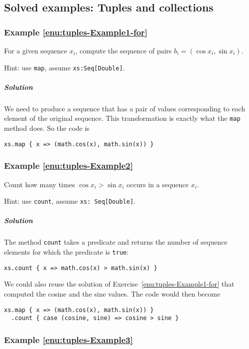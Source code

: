 \subsection{Solved examples: Tuples and collections}

\subsubsection{Example \label{enu:tuples-Example1-for}\ref{enu:tuples-Example1-for}}

For a given sequence $x_{i}$, compute the sequence of pairs $b_{i}=\left(\cos x_{i},\sin x_{i}\right)$.

Hint: use \lstinline!map!, assume \lstinline!xs:Seq[Double]!.

\subparagraph{Solution}

We need to produce a sequence that has a pair of values corresponding
to each element of the original sequence. This transformation is exactly
what the \lstinline!map! method does. So the code is
\begin{lstlisting}
xs.map { x => (math.cos(x), math.sin(x)) }
\end{lstlisting}


\subsubsection{Example \label{enu:tuples-Example2}\ref{enu:tuples-Example2}}

Count how many times $\cos x_{i}>\sin x_{i}$ occurs in a sequence
$x_{i}$.

Hint: use \lstinline!count!, assume \lstinline!xs: Seq[Double]!.

\subparagraph{Solution }

The method \lstinline!count! takes a predicate and returns the number
of sequence elements for which the predicate is \lstinline!true!:
\begin{lstlisting}
xs.count { x => math.cos(x) > math.sin(x) }
\end{lstlisting}
We could also reuse the solution of Exercise~\ref{enu:tuples-Example1-for}
that computed the cosine and the sine values. The code would then
become
\begin{lstlisting}
xs.map { x => (math.cos(x), math.sin(x)) }
  .count { case (cosine, sine) => cosine > sine }
\end{lstlisting}


\subsubsection{Example \label{enu:tuples-Example3}\ref{enu:tuples-Example3}}

